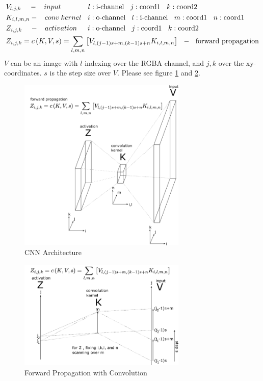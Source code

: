 \documentclass[a4]{article}
\begin{document}
\begin{equation}
\begin{aligned}
&V_{l,j,k}  \:\:\:\:\:-\:\:\:\:input\hspace{3.8em} l:\text{i-channel}\:\:\:\: j:\text{coord1}\:\:\:\:k:\text{coord2}\\
&K_{i,l,m,n} -\:\:\:\:conv\:kernel\:\:\:\: i:\text{o-channel} 
\:\:\:\: l:\text{i-channel}
\:\:\:\: m:\text{coord1}\:\:\:\:n:\text{coord1}\\
&Z_{i,j,k}  \:\:\:\:\:-\:\:\:\:activation\hspace{1.5em}
i:\text{o-channel}\:\:\:\: j:\text{coord1}\:\:\:\:k:\text{coord2}\\
&Z_{i,j,k} = c\left( K, V, s \right) = \sum_{l,m,n}\left[ V_{l, (j-1)s+m, (k-1)s+n} K_{i,l,m,n} \right]
\:\:\:-\:\:\:\text{forward propagation}
\end{aligned}
\end{equation}
$V$ can be an image with $l$ indexing over the RGBA channel, and $j,k$ over the xy-coordinates.
$s$ is the step size over $V$.
Please see figure \ref{fig:cnn} and  \ref{fig:cnn_G}.

\begin{figure}[!htb]
\centering
\includegraphics[width=8cm]{cnn.png}
\caption{CNN Architecture}
\label{fig:cnn}
\end{figure}


\begin{figure}[!htb]
\centering
\includegraphics[width=8cm]{cnn_G.png}
\caption{Forward Propagation with Convolution}
\label{fig:cnn_G}
\end{figure}
\end{document}
